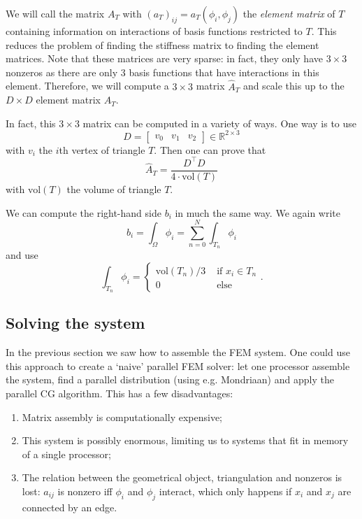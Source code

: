 \documentclass[11pt]{amsart}
\theoremstyle{definition}
\newcommand{\R}{\mathbb{R}}
\begin{document}
We will call the matrix $A_T$ with $(a_T)_{ij} = a_T(\phi_i, \phi_j)$ the \emph{element matrix} of $T$ containing information on interactions of basis functions restricted to $T$. This reduces the problem of finding the stiffness matrix to finding the element matrices. Note that these matrices are very sparse: in fact, they only have $3 \times 3$ nonzeros as there are only 3 basis functions that have interactions in this element. Therefore, we will compute a $3 \times 3$ matrix $\hat A_T$ and scale this up to the $D \times D$ element matrix $A_T$.

In fact, this $3 \times 3$ matrix can be computed in a variety of ways. One way is to use
\[
  D = \begin{bmatrix} v_{0} & v_{1} & v_{2} \end{bmatrix} \in \R^{ 2 \times 3}
\]
with $v_{i}$ the $i$th vertex of triangle $T$. Then one can prove \cite{TODO} that
\[
  \hat A_T = \frac{D^\top D}{4 \cdot \text{vol}(T)}
\]
with $\text{vol}(T)$ the volume of triangle $T$.

We can compute the right-hand side $b_i$ in much the same way. We again write
\[
  b_i = \int_\Omega \phi_i = \sum_{n=0}^N \int_{T_n} \phi_i
\]
and use \cite{TODOJAN}
\[
\int_{T_n} \phi_i = \begin{cases} \text{vol}(T_n)/3 & \text{ if } x_i \in T_n \\ 0 & \text{ else} \end{cases}.
\]

\subsection{Solving the system}
In the previous section we saw how to assemble the FEM system. One could use this approach to create a `naive' parallel FEM solver: let one processor assemble the system, find a parallel distribution (using e.g. Mondriaan) and apply the parallel CG algorithm. This has a few disadvantages:
\begin{enumerate}
  \item Matrix assembly is computationally expensive;
  \item This system is possibly enormous, limiting us to systems that fit in memory of a single processor;
  \item The relation between the geometrical object, triangulation and nonzeros is lost: $a_{ij}$ is nonzero iff $\phi_i$ and $\phi_j$ interact, which only happens if $x_i$ and $x_j$ are connected by an edge.
\end{enumerate}
\end{document}
